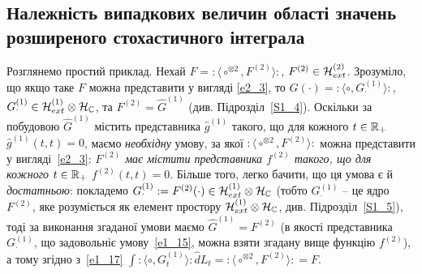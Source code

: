 \subsection{Належність випадкових величин області значень розширеного стохастичного інтеграла}
Розглянемо простий приклад. Нехай $F={:\!\langle}\circ^{\otimes 2},F^{(2)}{\rangle\!:}$,
$F^{(2)}\in\mathcal{H}_{ext}^{(2)}$. Зрозуміло, що якщо таке $F$ можна представити у вигляді
\eqref{e2_3}, то $G(\cdot)={:\!\langle}\circ,G^{(1)}_\cdot{\rangle\!:}$,
$G^{(1)}_\cdot\in\mathcal{H}_{ext}^{(1)}\otimes\mathcal{H}_{\mathbb{C}}$,
та $F^{(2)}=\widehat G^{(1)}$ (див. Підрозділ~\ref{S1_4}). Оскільки за побудовою
$\widehat G^{(1)}$ містить представника $\widehat g^{(1)}$ такого, що для кожного
$t\in\mathbb{R}_+$ $\widehat g^{(1)}(t,t)=0$, маємо {\it необхідну} умову, за якої
${:\!\langle}\circ^{\otimes 2},F^{(2)}{\rangle\!:}$ можна представити у вигляді~\eqref{e2_3}:
{\it $F^{(2)}$ має містити представника $f^{(2)}$ такого, що для кожного
$t\in\mathbb{R}_+$ $f^{(2)}(t,t)=0$}. Більше того, легко бачити, що ця умова є й {\it достатньою}:
покладемо $G^{(1)}_\cdot:=F^{(2)}(\cdot)\in\mathcal{H}_{ext}^{(1)}\otimes\mathcal{H}_{\mathbb{C}}$
(тобто $G^{(1)}_\cdot$ -- це ядро $F^{(2)}$, яке розуміється як елемент
простору $\mathcal{H}_{ext}^{(1)}\otimes\mathcal{H}_{\mathbb{C}}$, див. Підрозділ~\ref{S1_5}),
тоді за виконання згаданої умови маємо $\widehat G^{(1)}=F^{(2)}$ (в якості представника
$G^{(1)}_\cdot$, що задовольніє умову~\eqref{e1_15}, можна взяти згадану вище функцію $f^{(2)}$),
а тому згідно з~\eqref{e1_17} $\int{:\!\langle}\circ,G^{(1)}_t{\rangle\!:}\widehat dL_t
={:\!\langle}\circ^{\otimes 2},F^{(2)}{\rangle\!:}=F$.

